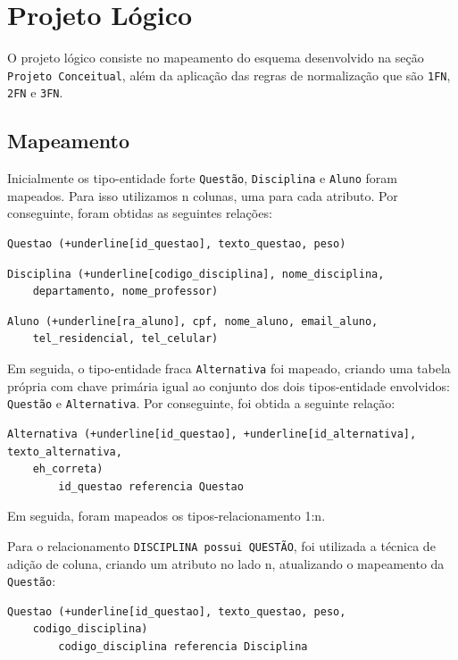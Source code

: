 \documentclass[12pt,a4paper]{article}
\begin{document}
\section{Projeto Lógico}

O projeto lógico consiste no mapeamento do esquema desenvolvido na seção \texttt{Projeto Conceitual}, além da aplicação das regras de normalização que são \texttt{1FN}, \texttt{2FN} e \texttt{3FN}.

\subsection{Mapeamento}

Inicialmente os tipo-entidade forte \texttt{Questão}, \texttt{Disciplina} e \texttt{Aluno} foram mapeados. Para isso utilizamos n colunas, uma para cada atributo. Por conseguinte, foram obtidas as seguintes relações:

\begin{Verbatim}[commandchars=+\[\]]
    Questao (+underline[id_questao], texto_questao, peso)
\end{Verbatim}
\begin{Verbatim}[commandchars=+\[\]]
    Disciplina (+underline[codigo_disciplina], nome_disciplina,
    departamento, nome_professor)
\end{Verbatim}
\begin{Verbatim}[commandchars=+\[\]]
    Aluno (+underline[ra_aluno], cpf, nome_aluno, email_aluno,
    tel_residencial, tel_celular)
\end{Verbatim}

Em seguida, o tipo-entidade fraca \texttt{Alternativa} foi mapeado, criando uma tabela própria com chave primária igual ao conjunto dos dois tipos-entidade envolvidos: \texttt{Questão} e \texttt{Alternativa}. Por conseguinte, foi obtida a seguinte relação:

\begin{Verbatim}[commandchars=+\[\]]
    Alternativa (+underline[id_questao], +underline[id_alternativa], texto_alternativa, 
    eh_correta)
        id_questao referencia Questao
\end{Verbatim}

Em seguida, foram mapeados os tipos-relacionamento 1:n.

Para o relacionamento \texttt{DISCIPLINA possui QUESTÃO}, foi utilizada a técnica de adição de coluna, criando um atributo no lado n, atualizando o mapeamento da \texttt{Questão}:

\begin{Verbatim}[commandchars=+\[\]]
    Questao (+underline[id_questao], texto_questao, peso,
    codigo_disciplina)
        codigo_disciplina referencia Disciplina
\end{Verbatim}
\end{document}
